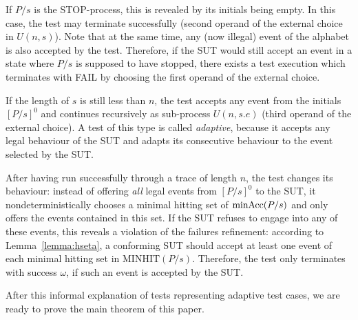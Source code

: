 If $P/s$ is the STOP-process, this is revealed by its initials being empty. In this case, the test may terminate 
successfully (second operand of the external choice in $U(n,s)$). Note that at the same time, any (now illegal) event of the alphabet is also accepted by the test.
Therefore,
if the SUT would still accept an event in a state where $P/s$ is supposed to have stopped, there exists a test execution which terminates with FAIL by choosing the first
operand of the external choice.

If the length of $s$ is still less than $n$, the test accepts any event from the initials
$[P/s]^0$ and continues recursively as sub-process $U(n,s.e)$ (third operand of the external choice). A test of this type is called \emph{adaptive}, because it accepts any legal behaviour of the SUT and adapts its consecutive behaviour to the event selected by the SUT.
 
After having  run successfully 
through a trace of length $n$, the test changes its behaviour:
instead of offering {\it all} legal events from $[P/s]^0$ to the SUT, 
it nondeterministically chooses 
a minimal hitting set of $\text{minAcc}(P/s)$ and only offers the events contained in this set.
If the SUT refuses to engage into any of these events, this reveals a violation of the
failures refinement: according to Lemma~\ref{lemma:hseta}, a conforming SUT should accept
at least one event of each minimal hitting set in $\text{MINHIT}(P/s)$. Therefore, the test
only terminates with success $\omega$, if such an event is accepted by the SUT.

After this informal explanation of tests representing adaptive test cases, we are ready to prove the main theorem of this paper.

